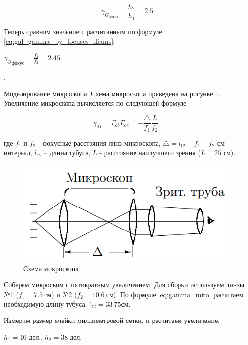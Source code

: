 \documentclass[a4paper, 12pt]{article}
\newcounter{Points}
\newcommand{\point}{\arabic{Points}. \addtocounter{Points}{1}}
\begin{document}
\begin{equation*}
    {\gamma_G}_{эксп} = \frac{h_2}{h_1} = 2.5
\end{equation*}

Теперь сравним значение с расчитанным по формуле \eqref{eq:gal_gamma_by_focuses_diams}:

\begin{center}
    $ {\gamma_G}_{фокус} = \frac{f_4}{f_2} = 2.45 $
\end{center}

\point Моделирование микроскопа. Схема микроскопа приведена на рисунке \ref{img:setup_micro}. Увеличение микроскопа вычисляется по следующей формуле

\begin{equation}
    \gamma_M = \Gamma_{ob} \Gamma_{oc} = -\frac{\triangle}{f_1} \frac{L}{f_2},
    \label{eq:gamma_miro}
\end{equation}

где $f_1$ и $f_2$ - фокусные расстояния линз микроскопа, $\triangle = l_{12}-f_1-f_2$ см - интервал, $ l_{12} $ -- длина тубуса, $L$ - расстояние наилучшего зрения ($L = 25$ см).

\begin{figure}[h]
    \centering
    \includegraphics[scale=0.7]{micro_setup.png}
    \caption{Схема микроскопа}
    \label{img:setup_micro}
\end{figure} 

Соберем микроском с пятикратным увеличением. Для сборки используем линзы №1 ($f_1 = 7.5~ см$) и №2 ($f_2 = 10.6~ см$). По формуле \eqref{eq:gamma_miro} расчитаем необходимую длину тубуса: $l_{12} = 33.75 см.$

Измерим размер ячейки миллиметровой сетки, и расчитаем увеличение.
\begin{center}
    $h_1 = 10 $ дел., \hspace{1cm} $h_2 = 38 $ дел. \par
\end{center}
\end{document}
